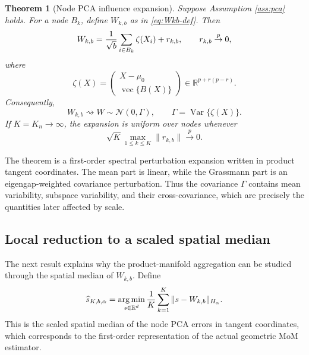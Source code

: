 \documentclass[11pt]{article}
\newtheorem{theorem}{Theorem}
\newcommand{\R}{\mathbb R}
\newcommand{\Var}{\operatorname{Var}}
\newcommand{\argmin}{\operatorname*{arg\,min}}
\newcommand{\dto}{\rightsquigarrow}
\newcommand{\pto}{\stackrel{p}{\to}}
\newcommand{\Normal}{\mathcal N}
\newcommand{\vecc}{\operatorname{vec}}
\begin{document}
\begin{theorem}[Node PCA influence expansion]\label{thm:pca-influence}
Suppose Assumption \ref{ass:pca} holds.  For a node \(B_k\), define \(W_{k,b}\) as in \eqref{eq:Wkb-def}.  Then
\begin{equation}\label{eq:pca-influence}
    W_{k,b}
    ={1\over\sqrt b}\sum_{i\in B_k}\zeta(X_i)+r_{k,b},
    \qquad
    r_{k,b}\pto0,
\end{equation}
where
\begin{equation}\label{eq:zeta-def}
    \zeta(X)=\begin{pmatrix}
        X-\mu_0\\
        \vecc\{B(X)\}
    \end{pmatrix}\in\R^{p+r(p-r)}.
\end{equation}
Consequently,
\begin{equation}\label{eq:W-clt}
    W_{k,b}\dto W\sim\Normal(0,\Gamma),
    \qquad
    \Gamma=\Var\{\zeta(X)\}.
\end{equation}
If \(K=K_n\to\infty\), the expansion is uniform over nodes whenever
\begin{equation}\label{eq:uniform-remainder-condition}
    \sqrt K\max_{1\le k\le K}\|r_{k,b}\|\pto0.
\end{equation}
\end{theorem}

The theorem is a first-order spectral perturbation expansion written in product tangent coordinates.  The mean part is linear, while the Grassmann part is an eigengap-weighted covariance perturbation.  Thus the covariance \(\Gamma\) contains mean variability, subspace variability, and their cross-covariance, which are precisely the quantities later affected by scale.

\subsection{Local reduction to a scaled spatial median}

The next result explains why the product-manifold aggregation can be studied through the spatial median of \(W_{k,b}\).  Define
\begin{equation}\label{eq:tangent-median}
    \widehat s_{K,b,\alpha}
    =\argmin_{s\in\R^d}{1\over K}\sum_{k=1}^K\|s-W_{k,b}\|_{H_\alpha}.
\end{equation}
This is the scaled spatial median of the node PCA errors in tangent coordinates, which corresponds to the first-order representation of the actual geometric MoM  estimator.
\end{document}
